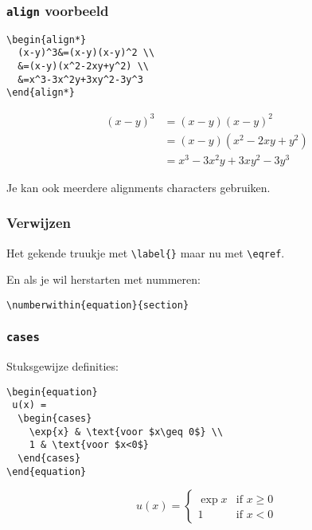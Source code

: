 \begin{frame}[fragile]
  \frametitle{\texttt{align} voorbeeld}

  \footnotesize
  \begin{verbatim}
\begin{align*}
  (x-y)^3&=(x-y)(x-y)^2 \\
  &=(x-y)(x^2-2xy+y^2) \\
  &=x^3-3x^2y+3xy^2-3y^3
\end{align*}
  \end{verbatim}
\begin{align*}
  (x-y)^3&=(x-y)(x-y)^2 \\
  &=(x-y)(x^2-2xy+y^2) \\
  &=x^3-3x^2y+3xy^2-3y^3
\end{align*}

Je kan ook meerdere alignments characters gebruiken.
\end{frame}

\begin{frame}[fragile]
  \frametitle{Verwijzen}

  Het gekende truukje met \texttt{\textcolor{uagreen}{\textbackslash label}\{\}} maar nu met \texttt{\textcolor{uagreen}{\textbackslash eqref}}.

  En als je wil herstarten met nummeren:
  \begin{verbatim}
\numberwithin{equation}{section}
  \end{verbatim}
\end{frame}

\begin{frame}[fragile]
  \frametitle{\texttt{cases}}

  Stuksgewijze definities:
  \begin{verbatim}
\begin{equation}
 u(x) =
  \begin{cases}
    \exp{x} & \text{voor $x\geq 0$} \\
    1 & \text{voor $x<0$}
  \end{cases}
\end{equation}
  \end{verbatim}
\begin{equation}
 u(x) =
  \begin{cases}
    \exp{x} & \text{if $x\geq 0$} \\
    1 & \text{if $x < 0$}
  \end{cases}
\end{equation}
\end{frame}

